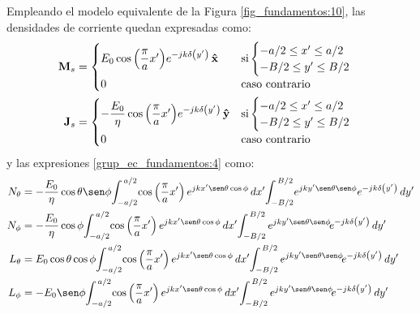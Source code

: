 Empleando el modelo equivalente de la Figura \ref{fig_fundamentos:10}, las densidades de corriente quedan expresadas como:
\begin{align}
\mathbf{M}_s &=
\begin{cases}
\makebox[0pt][l]{$E_0\cos\left(\dfrac{\pi}{a}x'\right)\!e^{-jk\delta\left(y'\right)}\,\versor{x}$}\hphantom{-\dfrac{E_0}{\eta}\cos\left(\dfrac{\pi}{a}x'\right)\!e^{-jk\delta\left(y'\right)}\,\versor{y}} &\text{si}
\begin{cases} 
-a/2 \leq x' \leq a/2\\
-B/2 \leq y' \leq B/2
\end{cases}\\
0 & \text{caso contrario}
\end{cases}
\label{ec_apB:79}\\
\mathbf{J}_s &= 
\begin{cases} 
-\dfrac{E_0}{\eta}\cos\left(\dfrac{\pi}{a}x'\right)\!e^{-jk\delta\left(y'\right)}\,\versor{y} &\text{si}
\begin{cases} 
-a/2 \leq x' \leq a/2\\
-B/2 \leq y' \leq B/2
\end{cases}\\
0  &\text{caso contrario}
\end{cases}
\label{ec_apB:80}
\end{align}
y las expresiones \eqref{grup_ec_fundamentos:4} como:
\begin{subequations}
\label{grup_ec_apB:16}
\begin{align}
N_{\theta} &= -\frac{E_0}{\eta}\cos\theta\sen\phi\!\int_{-a/2}^{\,a/2}\!\cos\left(\dfrac{\pi}{a}x'\right)e^{jkx'\sen\theta\cos\phi}\,dx'\!\int_{-B/2}^{\,B/2}\!e^{jky'\sen\theta\sen\phi}e^{-jk\delta\left(y'\right)}\,dy'
\label{ec_apB:81}\\
N_{\phi} &= -\frac{E_0}{\eta}\cos\phi\!\int_{-a/2}^{\,a/2}\!\cos\left(\dfrac{\pi}{a}x'\right)e^{jkx'\sen\theta\cos\phi}\,dx'\!\int_{-B/2}^{\,B/2}e^{jky'\sen\theta\sen\phi}\!e^{-jk\delta\left(y'\right)}\,dy'
\label{ec_apB:82}\\
L_{\theta}  &= E_0\cos\theta\cos\phi\!\int_{-a/2}^{\,a/2}\!\cos\left(\dfrac{\pi}{a}x'\right)e^{jkx'\sen\theta\cos\phi}\,dx'\!\int_{-B/2}^{\,B/2}e^{jky'\sen\theta\sen\phi}\!e^{-jk\delta\left(y'\right)}\,dy'
\label{ec_apB:83}\\
L_{\phi} &= -E_0\sen\phi\!\int_{-a/2}^{\,a/2}\!\cos\left(\dfrac{\pi}{a}x'\right)e^{jkx'\sen\theta\cos\phi}\,dx'\!\int_{-B/2}^{\,B/2}e^{jky'\sen\theta\sen\phi}\!e^{-jk\delta\left(y'\right)}\,dy'
\label{ec_apB:84}
\end{align}
\end{subequations}
